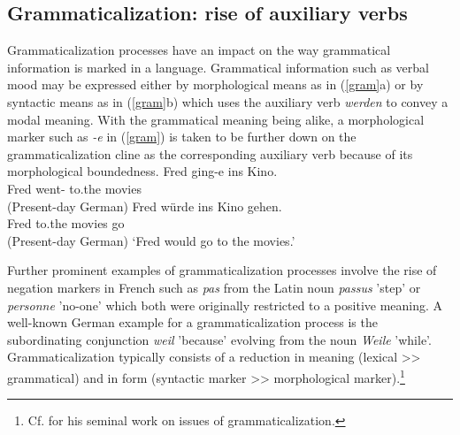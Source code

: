 \documentclass[output=paper]{langsci/langscibook}
\begin{document}
\subsection{Grammaticalization: rise of auxiliary verbs \label{GR}} 

Grammaticalization processes have an impact on the way grammatical information is marked in a language. Grammatical information such as verbal mood may be expressed either by morphological means as in (\ref{gram}a) or by syntactic means as in (\ref{gram}b) which uses the auxiliary verb \textit{werden} to convey a modal meaning. With the grammatical meaning being alike, a morphological marker such as \textit{-e} in (\ref{gram}) is taken to be further down on the grammaticalization cline as the corresponding auxiliary verb because of its morphological boundedness.  
\eal \label{gram}
\ex 
\gll Fred ging-e       ins    Kino.\\ 
     Fred went-\SBJV{} to.the movies\\  \hfill (Present-day German)
\ex
\gll Fred würde ins Kino gehen.\\ 
     Fred \SBJV{} to.the movies go\\  \hfill (Present-day German)
\glt `Fred would go to the movies.'
\zl

Further prominent examples of grammaticalization processes involve the rise of negation markers in French such as  \textit{pas} from the Latin noun \textit{passus} 'step' or \textit{personne} 'no-one' which both were originally restricted to a positive meaning. A well-known German example for a grammaticalization process is the subordinating conjunction \textit{weil} 'because' evolving from the noun \textit{Weile} 'while'. Grammaticalization typically consists of a reduction in meaning (lexical >> grammatical) and in form (syntactic marker >> morphological marker).\footnote{Cf. \cite{lehmann2015} for his seminal work on issues of grammaticalization.}
\end{document}

